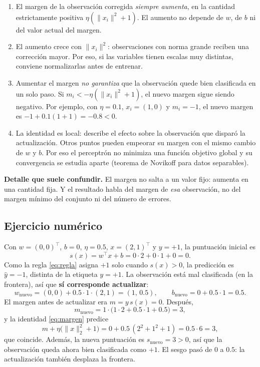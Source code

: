 \documentclass[12pt,a4paper]{article}
\newcommand{\norm}[1]{\lVert #1\rVert}
\begin{document}
\begin{enumerate}[leftmargin=1.4em,itemsep=0.25em]
  \item El margen de la observación corregida \emph{siempre aumenta}, en la
  cantidad estrictamente positiva $\eta(\norm{x_i}^2+1)$. El aumento no depende
  de $w$, de $b$ ni del valor actual del margen.
  \item El aumento crece con $\norm{x_i}^2$: observaciones con norma
  grande reciben una corrección mayor. Por eso, si las variables tienen escalas
  muy distintas, conviene normalizarlas antes de entrenar.
  \item Aumentar el margen \emph{no garantiza} que la observación quede bien
  clasificada en un solo paso. Si $m_i<-\eta(\norm{x_i}^2+1)$, el nuevo margen
  sigue siendo negativo. Por ejemplo, con $\eta=0.1$, $x_i=(1,0)$ y $m_i=-1$,
  el nuevo margen es $-1+0.1(1+1)=-0.8<0$.
  \item La identidad es local: describe el efecto sobre la observación que
  disparó la actualización. Otros puntos pueden empeorar su margen con el mismo
  cambio de $w$ y $b$. Por eso el perceptrón no minimiza una función objetivo
  global y su convergencia se estudia aparte (teorema de Novikoff para datos
  separables).
\end{enumerate}

\begin{cajaOjo}
  \textbf{Detalle que suele confundir.} El margen no salta a un valor fijo:
  aumenta en una cantidad fija. Y el resultado habla del margen de \emph{esa}
  observación, no del margen mínimo del conjunto ni del número de errores.
\end{cajaOjo}

\subsection{Ejercicio numérico}

Con $w=(0,0)^\top$, $b=0$, $\eta=0.5$, $x=(2,1)^\top$ y $y=+1$, la puntuación
inicial es
\begin{equation}
  s(x)=w^\top x+b=0\cdot2+0\cdot1+0=0.
\end{equation}
Como la regla \eqref{eq:regla} asigna $+1$ solo cuando $s(x)>0$, la predicción
es $\hat{y}=-1$, distinta de la etiqueta $y=+1$. La observación está mal
clasificada (en la frontera), así que \textbf{sí corresponde actualizar}:
\begin{equation}
  w_{\text{nuevo}}=(0,0)+0.5\cdot1\cdot(2,1)=(1,\,0.5),
  \qquad
  b_{\text{nuevo}}=0+0.5\cdot1=0.5.
\end{equation}
El margen antes de actualizar era $m=y\,s(x)=0$. Después,
\begin{equation}
  m_{\text{nuevo}}
  =1\cdot\bigl(1\cdot2+0.5\cdot1+0.5\bigr)
  =3,
\end{equation}
y la identidad \eqref{eq:margen} predice
\begin{equation}
  m+\eta\bigl(\norm{x}_2^2+1\bigr)
  =0+0.5\,(2^2+1^2+1)
  =0.5\cdot6=3,
\end{equation}
que coincide. Además, la nueva puntuación es $s_{\text{nuevo}}=3>0$, así que la
observación queda ahora bien clasificada como $+1$. El sesgo pasó de $0$ a
$0.5$: la actualización también desplaza la frontera.
\end{document}
